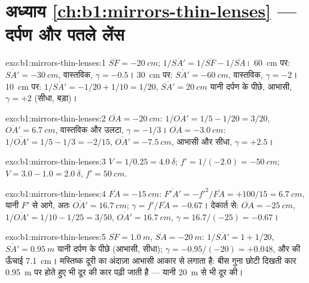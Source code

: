 \section*{अध्याय \ref{ch:b1:mirrors-thin-lenses} --- दर्पण और पतले लेंस}

\begin{solution}{exo:b1:mirrors-thin-lenses:1}
$\overline{SF} = \qty{-20}{cm}$; $1/\overline{SA'} = 1/\overline{SF} -
1/\overline{SA}$। \qty{60}{cm} पर: $\overline{SA'} = \qty{-30}{cm}$,
वास्तविक, $\gamma = -0.5$। \qty{30}{cm} पर: $\overline{SA'} = \qty{-60}{cm}$,
वास्तविक, $\gamma = -2$। \qty{10}{cm} पर: $1/\overline{SA'} = -1/20 + 1/10
= 1/20$, $\overline{SA'} = \qty{+20}{cm}$ यानी दर्पण के पीछे, आभासी,
$\gamma = +2$ (सीधा, बड़ा)।
\end{solution}

\begin{solution}{exo:b1:mirrors-thin-lenses:2}
$\overline{OA} = \qty{-20}{cm}$: $1/\overline{OA'} = 1/5 - 1/20 = 3/20$,
$\overline{OA'} = \qty{+6.7}{cm}$, वास्तविक और उलटा, $\gamma = -1/3$।
$\overline{OA} = \qty{-3.0}{cm}$: $1/\overline{OA'} = 1/5 - 1/3 = -2/15$,
$\overline{OA'} = \qty{-7.5}{cm}$, आभासी और सीधा, $\gamma = +2.5$।
\end{solution}

\begin{solution}{exo:b1:mirrors-thin-lenses:3}
$V = 1/0.25 = \qty{+4.0}{\delta}$; $f' = 1/(-2.0) = \qty{-50}{cm}$;
$V = 3.0 - 1.0 = \qty{+2.0}{\delta}$, $f' = \qty{50}{cm}$.
\end{solution}

\begin{solution}{exo:b1:mirrors-thin-lenses:4}
$\overline{FA} = \qty{-15}{cm}$: $\overline{F'A'} = -f'^2/\overline{FA}
= +100/15 = \qty{6.7}{cm}$, यानी $F'$ से आगे, अतः $\overline{OA'} = \qty{16.7}{cm}$;
$\gamma = f'/\overline{FA} = -0.67$। देकार्त से: $\overline{OA} =
\qty{-25}{cm}$, $1/\overline{OA'} = 1/10 - 1/25 = 3/50$,
$\overline{OA'} = \qty{16.7}{cm}$, $\gamma = 16.7/(-25) = -0.67$।
\end{solution}

\begin{solution}{exo:b1:mirrors-thin-lenses:5}
$\overline{SF} = \qty{+1.0}{m}$, $\overline{SA} = \qty{-20}{m}$:
$1/\overline{SA'} = 1 + 1/20$, $\overline{SA'} = \qty{0.95}{m}$ यानी दर्पण के
पीछे (आभासी, सीधा); $\gamma = -0.95/(-20) = +0.048$, और  की
ऊँचाई \qty{7.1}{cm}। मस्तिष्क दूरी का अंदाज़ा आभासी आकार से लगाता है: बीस गुना
छोटी दिखती कार \qty{0.95}{m} पर होते हुए भी दूर की कार पढ़ी जाती है --- यानी
\qty{20}{m} से भी दूर की।
\end{solution}

